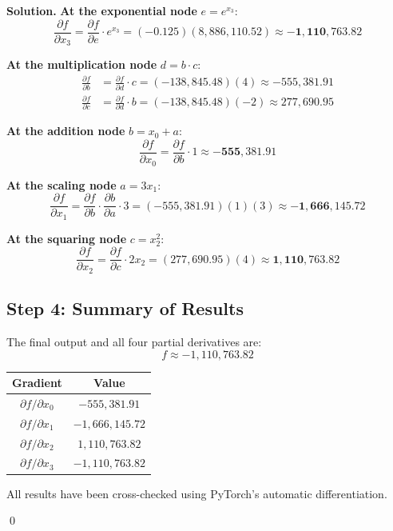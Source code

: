 \documentclass[10pt, a4paper]{article}
\newenvironment{Solution}{\textbf{Solution.}}{\qed}
\begin{document}
\begin{Solution}
\textbf{At the exponential node} $e = e^{x_3}$:
$$\frac{\partial f}{\partial x_3} = \frac{\partial f}{\partial e} \cdot e^{x_3} = (-0.125)(8{,}886{,}110.52) \approx \mathbf{-1{,}110{,}763.82}$$

\textbf{At the multiplication node} $d = b \cdot c$:
\begin{align*}
\frac{\partial f}{\partial b} &= \frac{\partial f}{\partial d} \cdot c = (-138{,}845.48)(4) \approx -555{,}381.91 \\
\frac{\partial f}{\partial c} &= \frac{\partial f}{\partial d} \cdot b = (-138{,}845.48)(-2) \approx 277{,}690.95
\end{align*}

\textbf{At the addition node} $b = x_0 + a$:
$$\frac{\partial f}{\partial x_0} = \frac{\partial f}{\partial b} \cdot 1 \approx \mathbf{-555{,}381.91}$$

\textbf{At the scaling node} $a = 3x_1$:
$$\frac{\partial f}{\partial x_1} = \frac{\partial f}{\partial b} \cdot \frac{\partial b}{\partial a} \cdot 3 = (-555{,}381.91)(1)(3) \approx \mathbf{-1{,}666{,}145.72}$$

\textbf{At the squaring node} $c = x_2^2$:
$$\frac{\partial f}{\partial x_2} = \frac{\partial f}{\partial c} \cdot 2x_2 = (277{,}690.95)(4) \approx \mathbf{1{,}110{,}763.82}$$

\subsection*{Step 4: Summary of Results}

The final output and all four partial derivatives are:
$$f \approx -1{,}110{,}763.82$$
\begin{center}
\begin{tabular}{cc}
\toprule
\textbf{Gradient} & \textbf{Value} \\
\midrule
$\partial f / \partial x_0$ & $-555{,}381.91$ \\
$\partial f / \partial x_1$ & $-1{,}666{,}145.72$ \\
$\partial f / \partial x_2$ & $1{,}110{,}763.82$ \\
$\partial f / \partial x_3$ & $-1{,}110{,}763.82$ \\
\bottomrule
\end{tabular}
\end{center}

\noindent All results have been cross-checked using PyTorch's automatic differentiation.

\end{Solution}
\end{document}
